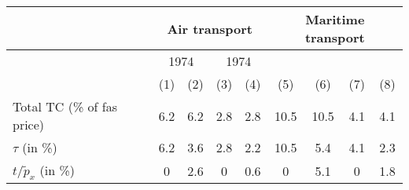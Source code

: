 \begin{tabular}{l|cc|cc|cc|cc}
& \multicolumn{4}{|c|}{Air transport} & \multicolumn{4}{|c}{Maritime transport} \\ \hline
& \multicolumn{2}{|c|}{1974} & \multicolumn{2}{c}{1974} \\
& (1) & (2) &  (3) & (4) & (5) & (6) &  (7) & (8)\\ \hline
Total TC (\% of fas price) & 6.2 & 6.2 & 2.8 & 2.8 & 10.5 & 10.5 & 4.1 & 4.1 \\
$\tau$ (in \%) & 6.2 & 3.6 & 2.8 & 2.2 & 10.5 & 5.4 & 4.1 & 2.3\\
$t/\widetilde{p}_x$ (in \%) & 0 & 2.6 & 0 & 0.6 & 0 & 5.1 & 0 & 1.8\\
\hline \hline
\end{tabular} 